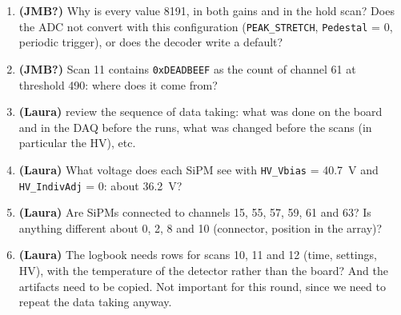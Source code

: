 \documentclass[11pt,a4paper]{article}
\begin{document}
\begin{enumerate}
\item \textbf{(JMB?)} Why is every value 8191, in both gains and in the hold scan? Does the ADC
  not convert with this configuration (\texttt{PEAK\_STRETCH}, \texttt{Pedestal} = 0, periodic
  trigger), or does the decoder write a default? 
  \item \textbf{(JMB?)} Scan 11 contains \texttt{0xDEADBEEF} as the count of channel 61 at
  threshold 490: where does it come from?
\item \textbf{(Laura)} review the sequence of data taking: what was done
  on the board and in the DAQ before the runs, what was changed before the scans (in
  particular the HV), etc.
\item \textbf{(Laura)} What voltage does each SiPM see with \texttt{HV\_Vbias} = 40.7~V and
  \texttt{HV\_IndivAdj} = 0: about 36.2~V?
\item \textbf{(Laura)} Are SiPMs connected to channels 15, 55, 57, 59, 61 and 63? Is anything
  different about 0, 2, 8 and 10 (connector, position in the array)?
\item \textbf{(Laura)} The logbook needs rows for scans 10, 11 and 12 (time, settings, HV),
  with the temperature of the detector rather than the board? And the
   artifacts need to be copied. Not important for this round, since we need
  to repeat the data taking anyway.
\end{enumerate}

%
\end{document}
